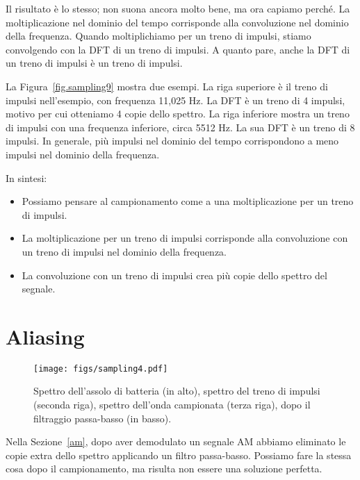 \documentclass[12pt]{book} \usepackage[width=5.5in,height=8.5in, hmarginratio=3:2,vmarginratio=1:1]{geometry}
\begin{document}
Il risultato è lo stesso; non suona ancora molto bene, ma ora capiamo perché. La moltiplicazione nel dominio del tempo corrisponde alla convoluzione nel dominio della frequenza. Quando moltiplichiamo per un treno di impulsi, stiamo convolgendo con la DFT di un treno di impulsi. A quanto pare, anche la DFT di un treno di impulsi è un treno di impulsi.

La Figura~\ref{fig.sampling9} mostra due esempi. La riga superiore è il treno di impulsi nell'esempio, con frequenza 11,025 Hz. La DFT è un treno di 4 impulsi, motivo per cui otteniamo 4 copie dello spettro. La riga inferiore mostra un treno di impulsi con una frequenza inferiore, circa 5512 Hz. La sua DFT è un treno di 8 impulsi. In generale, più impulsi nel dominio del tempo corrispondono a meno impulsi nel dominio della frequenza.

In sintesi:

\begin{itemize} 

\item Possiamo pensare al campionamento come a una moltiplicazione per un treno di impulsi.

\item La moltiplicazione per un treno di impulsi corrisponde alla convoluzione con un treno di impulsi nel dominio della frequenza.

\item La convoluzione con un treno di impulsi crea più copie dello spettro del segnale.

\end{itemize} 

\section{Aliasing} 

\begin{figure} 

\centerline{\texttt{[image: figs/sampling4.pdf]}} \caption{Spettro dell'assolo di batteria (in alto), spettro del treno di impulsi (seconda riga), spettro dell'onda campionata (terza riga), dopo il filtraggio passa-basso (in basso).} \label{fig.sampling4} \end{figure} 

Nella Sezione~\ref{am}, dopo aver demodulato un segnale AM abbiamo eliminato le copie extra dello spettro applicando un filtro passa-basso. Possiamo fare la stessa cosa dopo il campionamento, ma risulta non essere una soluzione perfetta.
\end{document}
